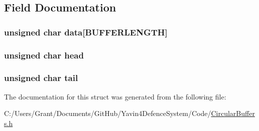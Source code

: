 \subsection{Field Documentation}
\hypertarget{structcircularBuffer_ad7b57ba90694482456be1fbab7de4aec}{
\subsubsection[{data}]{\setlength{\rightskip}{0pt plus 5cm}unsigned char data\mbox{[}{\bf B\+U\+F\+F\+E\+R\+L\+E\+N\+G\+T\+H}\mbox{]}}}\label{structcircularBuffer_ad7b57ba90694482456be1fbab7de4aec}
\hypertarget{structcircularBuffer_a47f7e6109597e5c1c227993c0ce5f560}{
\subsubsection[{head}]{\setlength{\rightskip}{0pt plus 5cm}unsigned char head}}\label{structcircularBuffer_a47f7e6109597e5c1c227993c0ce5f560}
\hypertarget{structcircularBuffer_af18a1d7542e277284c4794593b049258}{
\subsubsection[{tail}]{\setlength{\rightskip}{0pt plus 5cm}unsigned char tail}}\label{structcircularBuffer_af18a1d7542e277284c4794593b049258}


The documentation for this struct was generated from the following file\+:\begin{DoxyCompactItemize}
\item 
C\+:/\+Users/\+Grant/\+Documents/\+Git\+Hub/\+Yavin4\+Defence\+System/\+Code/\hyperlink{CircularBuffers_8h}{Circular\+Buffers.\+h}\end{DoxyCompactItemize}
